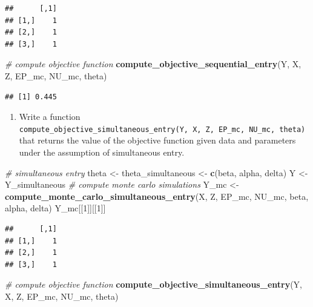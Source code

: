 \documentclass[]{book}
\newenvironment{Shaded}{\begin{snugshade}}{\end{snugshade}}
\newcommand{\KeywordTok}[1]{\textcolor[rgb]{0.13,0.29,0.53}{\textbf{#1}}}
\newcommand{\DecValTok}[1]{\textcolor[rgb]{0.00,0.00,0.81}{#1}}
\newcommand{\StringTok}[1]{\textcolor[rgb]{0.31,0.60,0.02}{#1}}
\newcommand{\CommentTok}[1]{\textcolor[rgb]{0.56,0.35,0.01}{\textit{#1}}}
\newcommand{\NormalTok}[1]{#1}
\providecommand{\tightlist}{%
  \setlength{\itemsep}{0pt}\setlength{\parskip}{0pt}}
\begin{document}
\begin{verbatim}
##      [,1]
## [1,]    1
## [2,]    1
## [3,]    1
\end{verbatim}

\begin{Shaded}
\begin{Highlighting}[]
\CommentTok{# compute objective function}
\KeywordTok{compute_objective_sequential_entry}\NormalTok{(Y, X, Z, EP_mc, NU_mc, theta)}
\end{Highlighting}
\end{Shaded}

\begin{verbatim}
## [1] 0.445
\end{verbatim}

\begin{enumerate}
\def\labelenumi{\arabic{enumi}.}
\setcounter{enumi}{2}
\tightlist
\item
  Write a function
  \texttt{compute\_objective\_simultaneous\_entry(Y,\ X,\ Z,\ EP\_mc,\ NU\_mc,\ theta)}
  that returns the value of the objective function given data and
  parameters under the assumption of simultaneous entry.
\end{enumerate}

\begin{Shaded}
\begin{Highlighting}[]
\CommentTok{# simultaneous entry}
\NormalTok{theta <-}\StringTok{ }\NormalTok{theta_simultaneous <-}
\StringTok{  }\KeywordTok{c}\NormalTok{(beta, alpha, delta)}
\NormalTok{Y <-}\StringTok{ }\NormalTok{Y_simultaneous}
\CommentTok{# compute monte carlo simulations}
\NormalTok{Y_mc <-}\StringTok{ }\KeywordTok{compute_monte_carlo_simultaneous_entry}\NormalTok{(X, Z, EP_mc, NU_mc, beta, alpha, delta)}
\NormalTok{Y_mc[[}\DecValTok{1}\NormalTok{]][[}\DecValTok{1}\NormalTok{]]}
\end{Highlighting}
\end{Shaded}

\begin{verbatim}
##      [,1]
## [1,]    1
## [2,]    1
## [3,]    1
\end{verbatim}

\begin{Shaded}
\begin{Highlighting}[]
\CommentTok{# compute objective function}
\KeywordTok{compute_objective_simultaneous_entry}\NormalTok{(Y, X, Z, EP_mc, NU_mc, theta)}
\end{Highlighting}
\end{Shaded}
\end{document}
